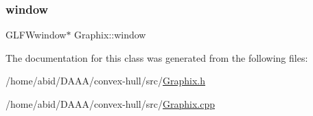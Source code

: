\subsubsection{\texorpdfstring{window}{window}}
{\footnotesize\ttfamily G\+L\+F\+Wwindow$\ast$ Graphix\+::window}



The documentation for this class was generated from the following files\+:\begin{DoxyCompactItemize}
\item 
/home/abid/\+D\+A\+A\+A/convex-\/hull/src/\mbox{\hyperlink{_graphix_8h}{Graphix.\+h}}\item 
/home/abid/\+D\+A\+A\+A/convex-\/hull/src/\mbox{\hyperlink{_graphix_8cpp}{Graphix.\+cpp}}\end{DoxyCompactItemize}
